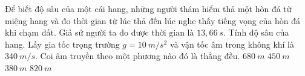 \begin{ex}%
Để biết độ sâu của một cái hang, những người thám hiểm thả một hòn đá từ miệng hang và đo thời gian từ lúc thả đến lúc nghe thấy tiếng vọng của hòn đá khi chạm đất. Giả sử người ta đo được thời gian là $13,66\ s$. Tính độ sâu của hang. Lấy gia tốc trọng trường $g = 10\ m/s^2$ và vận tốc âm trong không khí là $340\ m/s$. Coi âm truyền theo một phương nào đó là thẳng đều.
\choice
{\True $680\ m$}
{$450\ m$}
{$380\ m$}
{$820\ m$}
 \end{ex}

